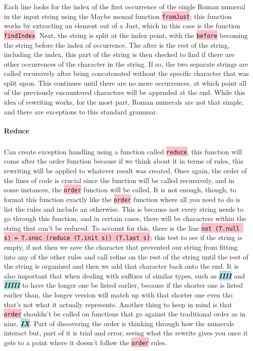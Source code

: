 \documentclass{article}
\begin{document}
Each line looks for the index of the first occurrence of the single Roman numeral in the input string using the Maybe monad function \colorbox{pink}{ \lstinline{fromJust}}; this function works by extracting an element out of a Just, which in this case is the function \colorbox{pink}{ \lstinline{findIndex}}. Next, the string is split at the index point, with the \colorbox{pink}{ \lstinline{before}} becoming the string before the index of occurrence. The after is the rest of the string, including the index, this part of the string is then checked to find if there are other occurrences of the character in the string. If so, the two separate strings are called recursively after being concatenated without the specific character that was split upon. This continues until there are no more occurrences, at which point all of the previously encountered characters will be appended at the end. While this idea of rewriting works, for the most part, Roman numerals are not that simple, and there are exceptions to this standard grammar.

\paragraph{Reduce}

\subparagraph{}

Can create exception handling using a function called \colorbox{pink}{ \lstinline{reduce}}, this function will come after the order function because if we think about it in terms of rules, this rewriting will be applied to whatever result was created. Once again, the order of the lines of code is crucial since the function will be called recursively, and in some instances, the \colorbox{pink}{ \lstinline{order}} function will be called. It is not enough, though, to format this function exactly like the \colorbox{pink}{ \lstinline{order}} function where all you need to do is list the rules and include an otherwise. This is because not every string needs to go through this function, and in certain cases, there will be characters within the string that can’t be reduced. To account for this, there is the line \colorbox{pink}{ \lstinline{not (T.null s) = T.snoc (reduce (T.init s)) (T.last s)}}; this test to see if the string is empty, if not then we save the character that prevented our string from fitting into any of the other rules and call refine on the rest of the string until the rest of the string is organized and then we add that character back onto the end. It is also important that when dealing with suffixes of similar types, such as \colorbox{powderblue}{\textbf{\textit{IIII}}} and \colorbox{powderblue}{\textbf{\textit{IIIII}}} to have the longer one be listed earlier, because if the shorter one is listed earlier than, the longer version will match up with that shorter one even tho that’s not what it actually represents. Another thing to keep in mind is that \colorbox{pink}{ \lstinline{order}} shouldn’t be called on functions that go against the traditional order as in nine, \colorbox{powderblue}{\textbf{\textit{IX}}}. Part of discovering the order is thinking through how the numerals interact but, part of it is trial and error, seeing what the rewrite gives you once it gets to a point where it doesn’t follow the \colorbox{pink}{\lstinline{order}} rules. 
\end{document}
